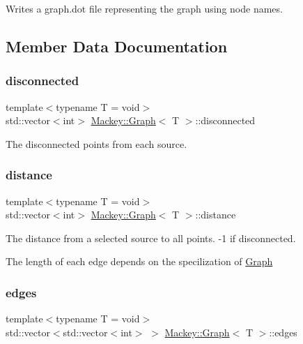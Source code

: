 Writes a graph.\+dot file representing the graph using node names. 



\subsection{Member Data Documentation}
\mbox{\label{classMackey_1_1Graph_a1ac2413768ead078e79b8f1c96d815e5}} 
\subsubsection{\texorpdfstring{disconnected}{disconnected}}
{\footnotesize\ttfamily template$<$typename T = void$>$ \\
std\+::vector$<$int$>$ \hyperlink{classMackey_1_1Graph}{Mackey\+::\+Graph}$<$ T $>$\+::disconnected}



The disconnected points from each source. 

\mbox{\label{classMackey_1_1Graph_a0de605e2b229c560932e8cb5a2866339}} 
\subsubsection{\texorpdfstring{distance}{distance}}
{\footnotesize\ttfamily template$<$typename T = void$>$ \\
std\+::vector$<$int$>$ \hyperlink{classMackey_1_1Graph}{Mackey\+::\+Graph}$<$ T $>$\+::distance}



The distance from a selected source to all points. -\/1 if disconnected. 

The length of each edge depends on the specilization of \hyperlink{classMackey_1_1Graph}{Graph} \mbox{\label{classMackey_1_1Graph_a729ec24b9f9e504f4c4e2d3f6e2cab83}} 
\subsubsection{\texorpdfstring{edges}{edges}}
{\footnotesize\ttfamily template$<$typename T = void$>$ \\
std\+::vector$<$std\+::vector$<$int$>$ $>$ \hyperlink{classMackey_1_1Graph}{Mackey\+::\+Graph}$<$ T $>$\+::edges}



